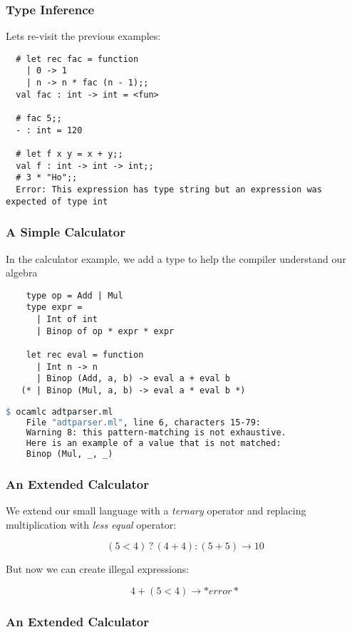 \documentclass[xcolor=svgnames]{beamer}
\renewcommand{\_}{\mathunderscore}
\begin{document}
\begin{frame}[fragile]
  \frametitle{Type Inference}
  Lets re-visit the previous examples:
  \begin{lstlisting}
  # let rec fac = function
    | 0 -> 1
    | n -> n * fac (n - 1);;
  val fac : int -> int = <fun>

  # fac 5;;
  - : int = 120

  # let f x y = x + y;;
  val f : int -> int -> int;;
  # 3 * "Ho";;
  Error: This expression has type string but an expression was expected of type int
  \end{lstlisting}

\end{frame}

\begin{frame}[fragile]
  \frametitle{A Simple Calculator}
  In the calculator example, we add a type to help the compiler
  understand our algebra
  \begin{lstlisting}
    type op = Add | Mul
    type expr =
      | Int of int
      | Binop of op * expr * expr

    let rec eval = function
      | Int n -> n
      | Binop (Add, a, b) -> eval a + eval b
   (* | Binop (Mul, a, b) -> eval a * eval b *)

  \end{lstlisting}
  \pause
  \begin{lstlisting}[language=make,frame=none,numbers=none]
    $ ocamlc adtparser.ml
    File "adtparser.ml", line 6, characters 15-79:
    Warning 8: this pattern-matching is not exhaustive.
    Here is an example of a value that is not matched:
    Binop (Mul, _, _)
  \end{lstlisting}

\end{frame}

\begin{frame}[fragile]
  \frametitle{An Extended Calculator}
  We extend our small language with a \textit{ternary} operator and
  replacing multiplication with  \textit{less equal} operator:

  \[(5 < 4) \mathbin? (4 + 4) : (5 + 5) \to 10\]

  \pause
  But now we can create illegal expressions:

  \[4 + (5 < 4) \to *error*\]

\end{frame}

\begin{frame}[fragile]
  \frametitle{An Extended Calculator}
  
\end{frame}
\end{document}
